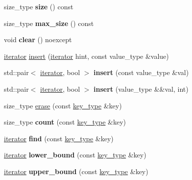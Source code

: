 \begin{DoxyCompactItemize}
\item 
\mbox{\label{classMap_ac09327f6b20e2cf6494db20b15a74553}} 
size\+\_\+type {\bfseries size} () const
\item 
\mbox{\label{classMap_ad2df9271f8e95e5df3d76ee2fe3cdadf}} 
size\+\_\+type {\bfseries max\+\_\+size} () const
\item 
\mbox{\label{classMap_abaa97410af844e201b6cf3fead17cebf}} 
void {\bfseries clear} () noexcept
\item 
\hyperlink{classMapIterator}{iterator} \hyperlink{classMap_a7ee01410e4c4ed9e8e678cc3b714f59f}{insert} (\hyperlink{classMapIterator}{iterator} hint, const value\+\_\+type \&value)
\item 
\mbox{\label{classMap_a7c9c035cedcd27121db450b2720ea75d}} 
std\+::pair$<$ \hyperlink{classMapIterator}{iterator}, bool $>$ {\bfseries insert} (const value\+\_\+type \&val)
\item 
\mbox{\label{classMap_a1a0b9c80e402040b8c14b7bddecba54a}} 
std\+::pair$<$ \hyperlink{classMapIterator}{iterator}, bool $>$ {\bfseries insert} (value\+\_\+type \&\&val, int)
\item 
size\+\_\+type \hyperlink{classMap_a87d125f634066766b87aae4092692453}{erase} (const \hyperlink{classMap_a430e42d1c6a02e95eb3a34626e313441}{key\+\_\+type} \&key)
\item 
\mbox{\label{classMap_a91cb676813d064b93bb6dd4476e3eb3e}} 
size\+\_\+type {\bfseries count} (const \hyperlink{classMap_a430e42d1c6a02e95eb3a34626e313441}{key\+\_\+type} \&key)
\item 
\mbox{\label{classMap_a4792661a13f3716bb12fc5be1235cde2}} 
\hyperlink{classMapIterator}{iterator} {\bfseries find} (const \hyperlink{classMap_a430e42d1c6a02e95eb3a34626e313441}{key\+\_\+type} \&key)
\item 
\mbox{\label{classMap_aa7ffb3495d9dc40110f77006230b32ed}} 
\hyperlink{classMapIterator}{iterator} {\bfseries lower\+\_\+bound} (const \hyperlink{classMap_a430e42d1c6a02e95eb3a34626e313441}{key\+\_\+type} \&key)
\item 
\mbox{\label{classMap_acd736fa422a1f5be31b8bb8190949d27}} 
\hyperlink{classMapIterator}{iterator} {\bfseries upper\+\_\+bound} (const \hyperlink{classMap_a430e42d1c6a02e95eb3a34626e313441}{key\+\_\+type} \&key)
\end{DoxyCompactItemize}

